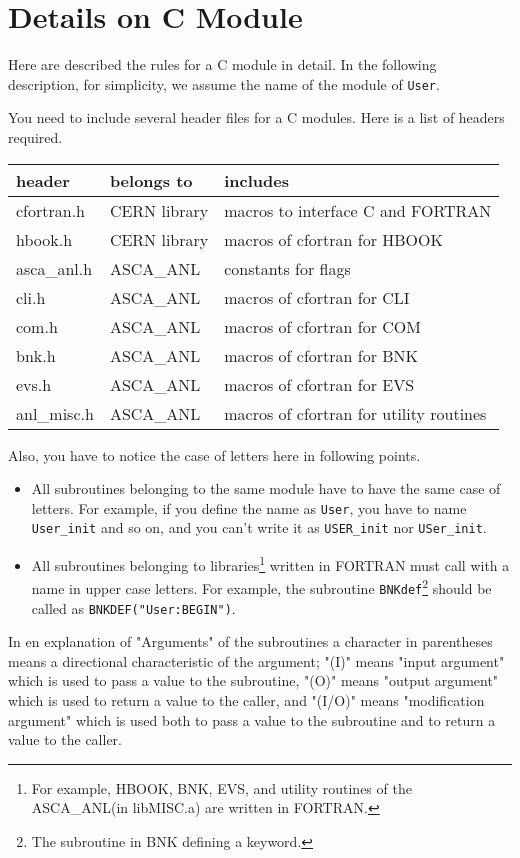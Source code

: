 \chapter{Details on C Module}\label{chap:details-on-C}
Here are described the rules for a C module in detail.
In the following description,
for simplicity,
we assume the name of the module of {\tt User}.

You need to include several header files for a C modules.
Here is a list of headers required.
\begin{center}
\begin{tabular}{lll}
\hline
  header & belongs to & includes \\
\hline
  cfortran.h	& CERN library	& macros to interface C and FORTRAN\\
  hbook.h	& CERN library	& macros of cfortran for HBOOK\\
  asca\_anl.h	& ASCA\_ANL	& constants for flags\\
  cli.h		& ASCA\_ANL	& macros of cfortran for CLI\\
  com.h		& ASCA\_ANL	& macros of cfortran for COM\\
  bnk.h		& ASCA\_ANL	& macros of cfortran for BNK\\
  evs.h		& ASCA\_ANL	& macros of cfortran for EVS\\
  anl\_misc.h	& ASCA\_ANL	& macros of cfortran for utility routines\\
\hline
\end{tabular}
\end{center}

Also,
you have to notice the case of letters here in following points.
\begin{itemize}
\item
All subroutines belonging to the same module
have to have the same case of letters.
For example,
if you define the name as {\tt User},
you have to name {\tt User\_init} and so on,
and you can't write it as {\tt USER\_init} nor {\tt USer\_init}.
\item
All subroutines belonging to libraries\footnote{
For example,
HBOOK, BNK, EVS, and utility routines of the ASCA\_ANL(in libMISC.a)
are written in FORTRAN.
}
written in FORTRAN must call with a name in upper case letters.
For example,
the subroutine {\tt BNKdef}\footnote{
The subroutine in BNK defining a keyword.
}
should be called as {\tt BNKDEF("User:BEGIN")}.
\end{itemize}

In en explanation of "Arguments" of the subroutines
a character in parentheses means
a directional characteristic of the argument;
"(I)" means "input argument"
which is used to pass a value to the subroutine,
"(O)" means "output argument"
which is used to return a value to the caller,
and "(I/O)" means "modification argument"
which is used
both to pass a value to the subroutine
and to return a value to the caller.


